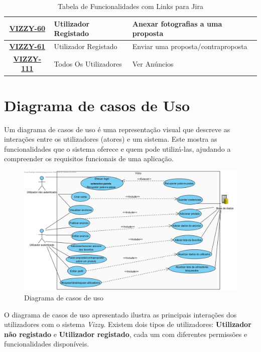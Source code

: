 \documentclass[a4paper, 12pt]{article} %
\begin{document}
\begin{table}[H]
{\begin{tabular}{|c|l|l|}
			\hline
			\href{https://basigraphics.atlassian.net/browse/VIZZY-60}{\textbf{VIZZY-60}} & Utilizador Registado & Anexar fotografias a uma proposta \\
			\hline
			\href{https://basigraphics.atlassian.net/browse/VIZZY-61}{\textbf{VIZZY-61}} & Utilizador Registado & Enviar uma proposta/contraproposta \\			
			\hline
			\href{https://basigraphics.atlassian.net/browse/VIZZY-111}{\textbf{VIZZY-111}} & Todos Os Utilizadores & Ver Anúncios \\
			\hline
		\end{tabular}%
	}
	\caption{Tabela de Funcionalidades com Links para Jira}
	\label{tab:funcionalidades_jira}
\end{table}

\newpage
\section{Diagrama de casos de Uso}

Um diagrama de casos de uso é uma representação visual que descreve as interações entre os utilizadores (atores) e um sistema. Este mostra as funcionalidades que o sistema oferece e quem pode utilizá-las, ajudando a compreender os requisitos funcionais de uma aplicação.


\begin{figure}[ht]
	\centering
	\includegraphics[width=\textwidth]{../images/use-case.png}
	\caption{Diagrama de casos de uso}
	\label{fig:casos de uso}
\end{figure}

O diagrama de casos de uso apresentado ilustra as principais interações dos utilizadores com o sistema \textit{Vizzy}. Existem dois tipos de utilizadores: \textbf{Utilizador não registado} e \textbf{Utilizador registado}, cada um com diferentes permissões e funcionalidades disponíveis.
\end{document}
